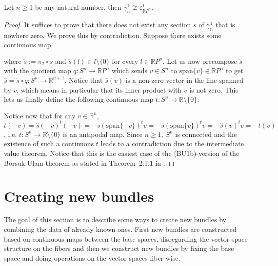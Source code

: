 \begin{proposition} Let $n\geq1$ be any natural number, then $\gamma_n^1\not\cong\varepsilon_{\mathbb{R}P^n}^1$.
\end{proposition}
\begin{proof} It suffices to prove that there does not exist any section $s$ of $\gamma_n^1$ that is nowhere zero. We prove this by contradiction. Suppose there exists some continuous map
\begin{center}
\end{center}
where $\tilde{s}:=\pi_2\circ s$ and $\tilde{s}(l)\in l\setminus\{0\}$ for every $l\in\mathbb{R}P^n$. Let us now precompose $\tilde{s}$ with the quotient map $q:S^n\to\mathbb{R}P^n$ which sends $v\in S^n$ to $\mathrm{span}\{v\}\in\mathbb{R}P^n$ to get $\hat{s}=\tilde{s}\circ q:S^n\to\mathbb{R}^{n+1}$. Notice that $\hat{s}(v)$ is a non-zero vector in the line spanned by $v$, which means in particular that its inner product with $v$ is not zero. This lets us finally define the following continuous map $t:S^n\to\mathbb{R}\setminus\{0\}$:
\begin{center}
\end{center}
Notice now that for any $v\in\mathbb{R}^n$,
$t(-v)=\hat{s}(-v)^t(-v)=-\tilde{s}(\mathrm{span}\{-v\})^tv=-\tilde{s}(\mathrm{span}\{v\})^tv=-\hat{s}(v)^tv=-t(v)$,
i.e. $t:S^n\to\mathbb{R}\setminus\{0\}$ is an antipodal map. Since $n\geq1$, $S^n$ is connected and the existence of such a continuous $t$ leads to a contradiction due to the intermediate value theorem. Notice that this is the easiest case of the (BU1b)-version of the Borsuk Ulam theorem as stated in Theorem~2.1.1 in \cite{BU_Matousek}.
\end{proof}

\section{Creating new bundles}
The goal of this section is to describe some ways to create new bundles by combining the data of already known ones. First new bundles are constructed based on continuous maps between the base spaces, disregarding the vector space structure on the fibers and then we construct new bundles by fixing the base space and doing operations on the vector spaces fiber-wise.


